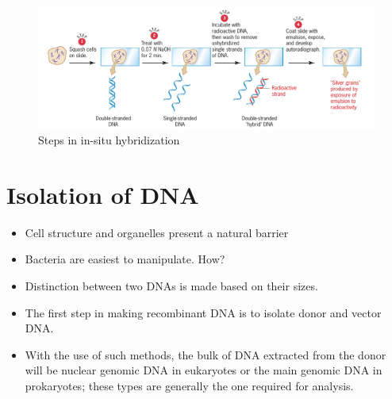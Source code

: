 \documentclass[11pt,dvipsnames,ignorenonframetext,aspectratio=169]{beamer}
\providecommand{\tightlist}{%
  \setlength{\itemsep}{0pt}\setlength{\parskip}{0pt}}
\begin{document}
\begin{frame}{}
\protect\hypertarget{section-5}{}

\begin{figure}
\includegraphics[width=0.65\linewidth]{./../images/insitu_hybrid_steps} \caption{Steps in in-situ hybridization}\label{fig:insitu-hybridization}
\end{figure}

\end{frame}

\hypertarget{isolation-of-dna}{%
\section{Isolation of DNA}\label{isolation-of-dna}}

\begin{frame}{}
\protect\hypertarget{section-6}{}

\begin{itemize}
\tightlist
\item
  Cell structure and organelles present a natural barrier
\item
  Bacteria are easiest to manipulate. How?
\item
  Distinction between two DNAs is made based on their sizes.
\item
  The first step in making recombinant DNA is to isolate donor and
  vector DNA.
\item
  With the use of such methods, the bulk of DNA extracted from the donor
  will be nuclear genomic DNA in eukaryotes or the main genomic DNA in
  prokaryotes; these types are generally the one required for analysis.
\end{itemize}

\end{frame}
\end{document}
